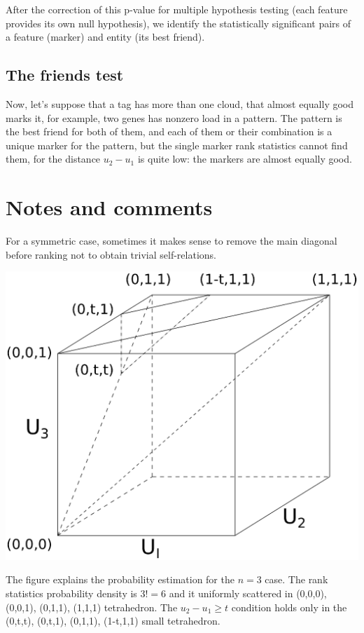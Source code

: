 \documentclass{llncs}
\begin{document}
After the correction of this p-value for multiple hypothesis testing (each feature provides its own null hypothesis), we identify the statistically significant pairs of a feature (marker) and entity (its best friend).

\subsection{The friends test}
Now, let's suppose that a tag has more than one cloud, that almost equally good marks it, for example, two genes has nonzero load in a pattern. The pattern is the best friend for both of them, and each of them or their combination is a unique marker for the pattern, but the single marker rank statistics cannot find them, for the distance $u_2-u_1$ is quite low: the markers are almost equally good.

\section*{Notes and comments}

For a symmetric case, sometimes it makes sense to remove the main diagonal before ranking not to obtain trivial self-relations.

\includegraphics[scale=.5,trim=0 10cm 0 0, clip=true]{rank3d-nocolour}

The figure explains the probability estimation for the $n=3$ case. The rank statistics probability density is $3!=6$ and it uniformly scattered in (0,0,0), (0,0,1), (0,1,1), (1,1,1) tetrahedron. The $u_2 - u_1 \ge t$ condition holds only in the (0,t,t), (0,t,1), (0,1,1), (1-t,1,1) small tetrahedron.
\end{document}
